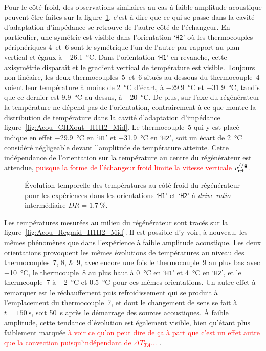 Pour le côté froid, des observations similaires au cas à faible amplitude acoustique peuvent être faites sur la figure~\ref{fig:Acou_CHXin_H1H2_Mid}, c'est-à-dire que ce qui se passe dans la cavité d'adaptation d'impédance se retrouve de l'autre côté de l'échangeur. En particulier, une symétrie est visible dans l'orientation `\texttt{H2}' où les thermocouples périphériques 4~et~6 sont le symétrique l'un de l'autre par rapport au plan vertical et égaux à \qty{-26.1}{\degreeCelsius}. Dans l'orientation `\texttt{H1}' en revanche, cette axisymétrie disparaît et le gradient vertical de température est visible. Toujours non linéaire, les deux thermocouples~5~et~6 situés au dessous du thermocouple~4 voient leur température à moins de \qty{2}{\degreeCelsius} d'écart, à \qty{-29.9}{\degreeCelsius} et \qty{-31.9}{\degreeCelsius}, tandis que ce dernier est \qty{9.9}{\degreeCelsius} au dessus, à \qty{-20}{\degreeCelsius}.
De plus, sur l'axe du régénérateur la température ne dépend pas de l'orientation, contrairement à ce que montre la distribution de température dans la cavité d'adaptation d'impédance figure~\ref{fig:Acou_CHXout_H1H2_Mid}. Le thermocouple~5 qui y est placé indique en effet \qty{-29,9}{\degreeCelsius} en `\texttt{H1}' et \qty{-31.9}{\degreeCelsius} en `\texttt{H2}', soit un écart de \qty{2}{\degreeCelsius} considéré négligeable devant l'amplitude de température atteinte. Cette indépendance de l'orientation sur la température au centre du régénérateur est attendue, \textcolor{red}{puisque la forme de l'échangeur froid limite la vitesse verticale $v_{\sf ref}^{// \mathbf g}$.}

\begin{figure}[!ht]
    \centering
    
    \caption{\'Evolution temporelle des températures au côté froid du régénérateur pour les expériences dans les orientations `\texttt{H1}' et `\texttt{H2}' à \textit{drive ratio} intermédiaire $DR=\qty{1.7}{\percent}$.}
    \label{fig:Acou_CHXin_H1H2_Mid}
\end{figure}

Les températures mesurées au milieu du régénérateur sont tracés sur la figure~\ref{fig:Acou_Regmid_H1H2_Mid}. Il est possible d'y voir, à nouveau, les mêmes phénomènes que dans l'expérience à faible amplitude acoustique. Les deux orientations provoquent les mêmes évolutions de températures au niveau des thermocouples~\numlist{7;8;9}, avec encore une fois le thermocouple~9 au plus bas avec \qty{-10}{\degreeCelsius}, le thermcouple~8 au plus haut à \qty{0}{\degreeCelsius} en `\texttt{H1}' et \qty{4}{\degreeCelsius} en `\texttt{H2}', et le thermcouple~7 à \qty{-2}{\degreeCelsius} et \qty{.5}{\degreeCelsius} pour ces mêmes orientations. Un autre effet à remarquer est le réchauffement puis refroidissement qui se produit à l'emplacement du thermocouple~7, et dont le changement de sens se fait à $t=\qty{150}{\second}$, soit \qty{50}{\second} après le démarrage des sources acoustiques. À faible amplitude, cette tendance d'évolution est également visible, bien qu'étant plus faiblement marquée \textcolor{red}{à voir ce qu'on peut dire de ça à part que c'est un effet autre que la convection puisqu'indépendant de $\Delta T_{TA}$... }. 

